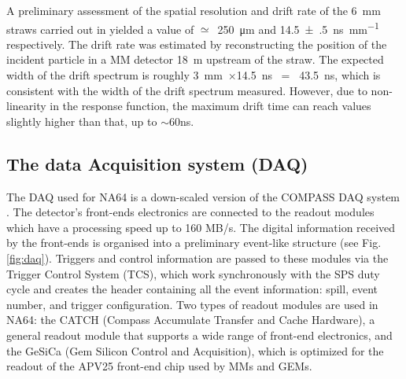A preliminary assessment of the spatial resolution and drift rate of the 6~mm straws carried out in \cite{Volkov:2019qhb} yielded a value of $\simeq$~\SI{250}{\micro\metre} and \SI[separate-uncertainty = true,per-mode=symbol]{14.5(5)}{\nano\second\per\milli\metre} respectively. The drift rate was estimated by reconstructing the position of the incident particle in a MM detector \SI{18}{\metre} upstream of the straw. The expected width of the drift spectrum is roughly 3~mm~$\times$14.5~ns~ = ~43.5~ns, which is consistent with the width of the drift spectrum measured. However, due to non-linearity in the response function, the maximum drift time can reach values slightly higher than that, up to $\sim$60ns.


\subsection{The data Acquisition system (DAQ)}
\label{ch2:sec:daq}

The DAQ used for NA64 is a down-scaled version of the COMPASS DAQ system \cite{Bodlak_2013,COMPASS-daq}. The detector's front-ends electronics are connected to the readout modules which have a processing speed up to 160 MB/s. The digital information received by the front-ends is organised into a preliminary event-like structure (see Fig.\ref{fig:daq}). Triggers and control information are passed to these modules via the Trigger Control System (TCS), which work synchronously with the SPS duty cycle and creates the header containing all the event information: spill, event number, and trigger configuration. Two types of readout modules are used in NA64: the CATCH (Compass Accumulate Transfer and Cache Hardware), a general readout module that supports a wide range of front-end electronics, and the GeSiCa (Gem Silicon Control and Acquisition), which is optimized for the readout of the APV25 front-end chip used by MMs and GEMs.

